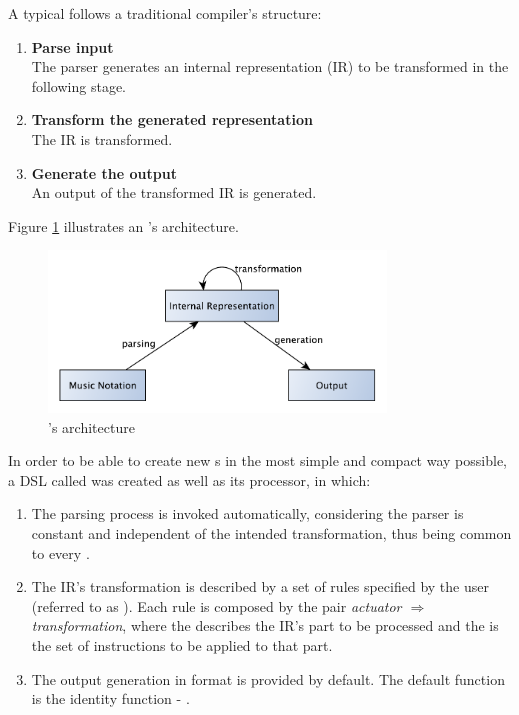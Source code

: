 \label{sec:abc_dt}

A typical \abcpt{} follows a traditional compiler's structure:

\begin{enumerate}
  \item \textbf{Parse \abc{} input}\\ \hfill
    The \abc{} parser generates an internal representation (\ac{IR}) to be transformed in the
    following stage.
  \item \textbf{Transform the generated representation}\\ \hfill
    The \ac{IR} is transformed.
  \item \textbf{Generate the output}\\ \hfill
    An output of the transformed \ac{IR} is generated.
\end{enumerate}

Figure \ref{fig:process_stages} illustrates an \abcpt{}'s architecture.

\begin{figure}[H]
  \centering
  \includegraphics[width=0.8\textwidth]{img/abc_dt.pdf}
  \caption{\abcpt{}'s architecture}
  \label{fig:process_stages}
\end{figure}

In order to be able to create new \abcpt{}s in the most simple and compact way possible, a \ac{DSL}
called \abcdt{} was created as well as its processor, in which:

\begin{enumerate}
  \item The parsing process is invoked automatically, considering the parser is constant and
  independent of the intended transformation, thus being common to every \abcpt{}.
  \item The \ac{IR}'s transformation is described by a set of rules specified by the user (referred
  to as \abcdtrules{}). Each rule is composed by the pair \emph{actuator $\Rightarrow$
  transformation}, where the \actuator{} describes the \ac{IR}'s part to be processed and the
  \transformation{} is the set of instructions to be applied to that part.
  \item The output generation in \abc{} format is provided by default. The default function is the
  identity function - \toabc{}.
\end{enumerate}

